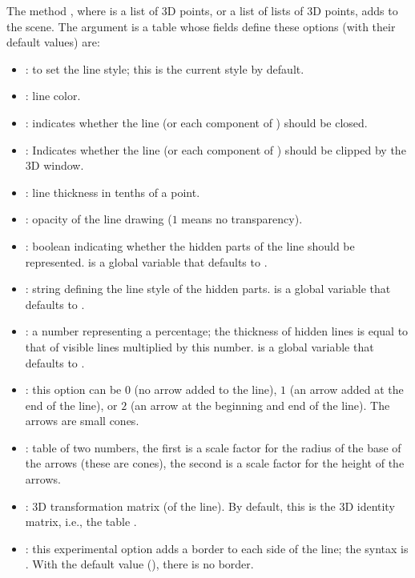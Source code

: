 The method , where  is a list of 3D points, or a list of lists of 3D points, adds  to the scene. The  argument is a table whose fields define these options (with their default values) are:
\begin{itemize}
    \item {}: to set the line style; this is the current style by default.
    \item {}: line color.

    \item {}: indicates whether the line  (or each component of ) should be closed.
     \item {}: Indicates whether the line  (or each component of ) should be clipped by the 3D window.

    \item {}: line thickness in tenths of a point.

    \item {}: opacity of the line drawing ($1$ means no transparency).

    \item {}: boolean indicating whether the hidden parts of the line should be represented.  is a global variable that defaults to \false.

    \item {}: string defining the line style of the hidden parts.  is a global variable that defaults to .
    
    \item {}: a number representing a percentage; the thickness of hidden lines is equal to that of visible lines multiplied by this number.  is a global variable that defaults to .

     \item {}: this option can be $0$ (no arrow added to the line), $1$ (an arrow added at the end of the line), or $2$ (an arrow at the beginning and end of the line). The arrows are small cones.

    \item {}: table of two numbers, the first is a scale factor for the radius of the base of the arrows (these are cones), the second is a scale factor for the height of the arrows.

    \item {}: 3D transformation matrix (of the line). By default, this is the 3D identity matrix, i.e., the table .
    
    \item {}: this experimental option adds a border to each side of the line; the syntax is . With the default value (\nil), there is no border.
\end{itemize}

